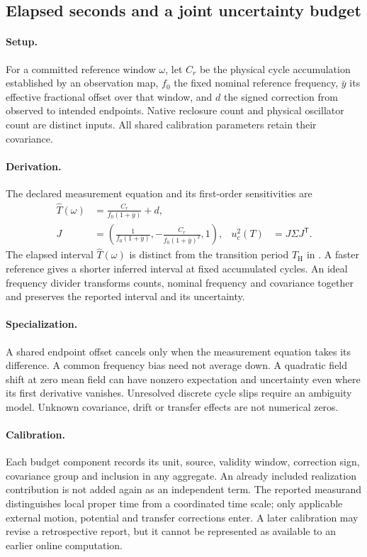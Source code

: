 \subsection{Elapsed seconds and a joint uncertainty budget}
\paragraph{Setup.}
For a committed reference window \(\omega\), let \(C_r\) be the physical cycle accumulation established by an observation map, \(f_0\) the fixed nominal reference frequency, \(\bar y\) its effective fractional offset over that window, and \(d\) the signed correction from observed to intended endpoints. Native reclosure count and physical oscillator count are distinct inputs. All shared calibration parameters retain their covariance.

\paragraph{Derivation.}
The declared measurement equation and its first-order sensitivities are
\begin{align}
\widehat T(\omega)&=\frac{C_r}{f_0(1+\bar y)}+d,
\label{eq:manual2-si-interval}\\
J&=\left(\frac{1}{f_0(1+\bar y)},
-\frac{C_r}{f_0(1+\bar y)^2},1\right),
&u_c^2(T)&=J\Sigma J^{\mathsf T}.
\label{eq:manual2-si-covariance}
\end{align}
The elapsed interval \(\widehat T(\omega)\) is distinct from the transition period \(\widehat T_{\mathrm H}\) in . A faster reference gives a shorter inferred interval at fixed accumulated cycles. An ideal frequency divider transforms counts, nominal frequency and covariance together and preserves the reported interval and its uncertainty.

\paragraph{Specialization.}
A shared endpoint offset cancels only when the measurement equation takes its difference. A common frequency bias need not average down. A quadratic field shift at zero mean field can have nonzero expectation and uncertainty even where its first derivative vanishes. Unresolved discrete cycle slips require an ambiguity model. Unknown covariance, drift or transfer effects are not numerical zeros.

\paragraph{Calibration.}
Each budget component records its unit, source, validity window, correction sign, covariance group and inclusion in any aggregate. An already included realization contribution is not added again as an independent term. The reported measurand distinguishes local proper time from a coordinated time scale; only applicable external motion, potential and transfer corrections enter. A later calibration may revise a retrospective report, but it cannot be represented as available to an earlier online computation.


